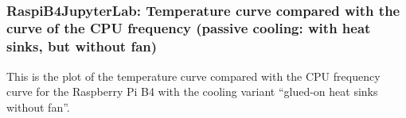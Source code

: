 \documentclass [oneside,10pt,a4paper,ngerman,BCOR10mm,headsepline,parindent,final]{scrartcl}
\begin{document}
    \begin{center}
    \end{center}
    { \hspace*{\fill} \\}
    
    \hypertarget{raspib4jupyterlab-temperature-curve-compared-with-the-curve-of-the-cpu-frequency-passive-cooling-with-heat-sinks-but-without-fan}{%
\subsubsection{RaspiB4JupyterLab: Temperature curve compared with the
curve of the CPU frequency (passive cooling: with heat sinks, but
without
fan)}\label{raspib4jupyterlab-temperature-curve-compared-with-the-curve-of-the-cpu-frequency-passive-cooling-with-heat-sinks-but-without-fan}}

This is the plot of the temperature curve compared with the CPU
frequency curve for the Raspberry Pi B4 with the cooling variant
``glued-on heat sinks without fan''.
\end{document}
